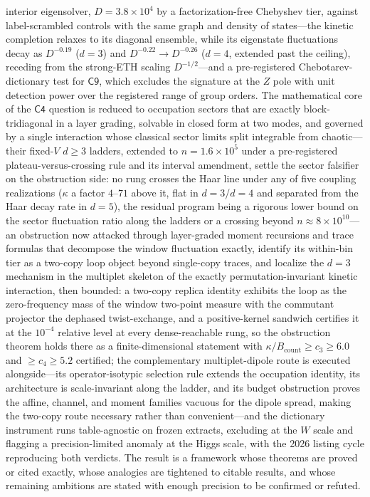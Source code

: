 interior eigensolver, $D=3.8\times10^{4}$ by a factorization-free Chebyshev tier, against
label-scrambled controls
with the same graph and density of states---the kinetic completion relaxes to its diagonal
ensemble, while its eigenstate fluctuations decay as $D^{-0.19}$ ($d=3$) and
$D^{-0.22}\to D^{-0.26}$ ($d=4$, extended past the ceiling), receding from the strong-ETH
scaling $D^{-1/2}$---and a pre-registered Chebotarev-dictionary test for $\mathsf{C9}$, which
excludes the signature at the $Z$ pole with unit detection power over the registered range of
group orders. The mathematical core of the $\mathsf{C4}$ question is reduced to occupation
sectors that are exactly block-tridiagonal in a layer grading, solvable in closed form at two
modes, and governed by a single interaction whose classical sector limits split integrable
from chaotic---their fixed-$V$ $d\ge3$ ladders, extended to $n=1.6\times10^{5}$ under a
pre-registered plateau-versus-crossing rule and its interval amendment, settle the
sector falsifier on the obstruction side: no rung crosses the Haar line under any of
five coupling realizations ($\kappa$ a factor $4$--$71$ above it, flat in $d=3$/$d=4$
and separated from the Haar decay rate in $d=5$), the residual program being a
rigorous lower bound on the sector fluctuation ratio along the ladders or a crossing
beyond $n\approx8\times10^{10}$---an obstruction now attacked through layer-graded
moment recursions and trace formulas that decompose the window fluctuation exactly,
identify its within-bin tier as a two-copy loop object beyond single-copy traces, and
localize the $d=3$ mechanism in the multiplet skeleton of the exactly
permutation-invariant kinetic interaction, then bounded: a two-copy replica identity
exhibits the loop as the zero-frequency mass of the window two-point measure with the
commutant projector the dephased twist-exchange, and a positive-kernel sandwich
certifies it at the $10^{-4}$ relative level at every dense-reachable rung, so the
obstruction theorem holds there as a finite-dimensional statement with
$\kappa/B_{\mathrm{count}}\ge c_{3}\ge6.0$ and $\ge c_{4}\ge5.2$ certified;
the complementary multiplet-dipole route is executed alongside---its
operator-isotypic selection rule extends the occupation identity, its
architecture is scale-invariant along the ladder, and its budget
obstruction proves the affine, channel, and moment families vacuous for
the dipole spread, making the two-copy route necessary rather than
convenient---and the
dictionary instrument runs table-agnostic on frozen extracts, excluding
at the $W$ scale and flagging a precision-limited anomaly at the Higgs scale, with
the 2026 listing cycle reproducing both verdicts. The result is a
framework whose theorems are proved or cited exactly, whose
analogies are tightened to citable results, and whose remaining ambitions are stated with
enough precision to be confirmed or refuted.

